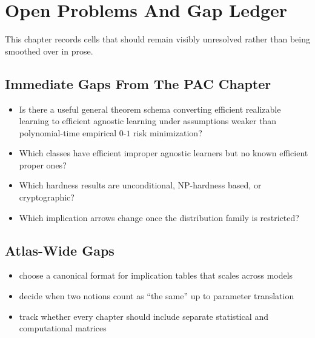 \chapter{Open Problems And Gap Ledger}

This chapter records cells that should remain visibly unresolved rather than being smoothed over in prose.

\section{Immediate Gaps From The PAC Chapter}

\begin{itemize}
\item Is there a useful general theorem schema converting efficient realizable learning to efficient agnostic learning under assumptions weaker than polynomial-time empirical $0$-$1$ risk minimization?
\item Which classes have efficient improper agnostic learners but no known efficient proper ones?
\item Which hardness results are unconditional, NP-hardness based, or cryptographic?
\item Which implication arrows change once the distribution family is restricted?
\end{itemize}

\section{Atlas-Wide Gaps}

\begin{itemize}
\item choose a canonical format for implication tables that scales across models
\item decide when two notions count as ``the same'' up to parameter translation
\item track whether every chapter should include separate statistical and computational matrices
\end{itemize}
